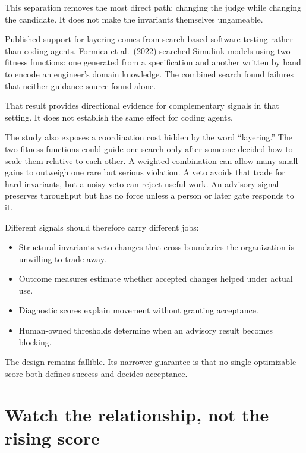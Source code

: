 This separation removes the most direct path: changing the judge while changing the candidate. It does not make the invariants themselves ungameable.

Published support for layering comes from search-based software testing rather than coding agents. Formica et al.~(\href{https://arxiv.org/abs/2207.11016}{2022}) searched Simulink models using two fitness functions: one generated from a specification and another written by hand to encode an engineer's domain knowledge. The combined search found failures that neither guidance source found alone.

That result provides directional evidence for complementary signals in that setting. It does not establish the same effect for coding agents.

The study also exposes a coordination cost hidden by the word ``layering.'' The two fitness functions could guide one search only after someone decided how to scale them relative to each other. A weighted combination can allow many small gains to outweigh one rare but serious violation. A veto avoids that trade for hard invariants, but a noisy veto can reject useful work. An advisory signal preserves throughput but has no force unless a person or later gate responds to it.


Different signals should therefore carry different jobs:

\begin{itemize}
\tightlist
\item
  Structural invariants veto changes that cross boundaries the organization is unwilling to trade away.
\item
  Outcome measures estimate whether accepted changes helped under actual use.
\item
  Diagnostic scores explain movement without granting acceptance.
\item
  Human-owned thresholds determine when an advisory result becomes blocking.
\end{itemize}

The design remains fallible. Its narrower guarantee is that no single optimizable score both defines success and decides acceptance.

\hypertarget{watch-the-relationship-not-the-rising-score}{%
\section{Watch the relationship, not the rising score}\label{watch-the-relationship-not-the-rising-score}}

